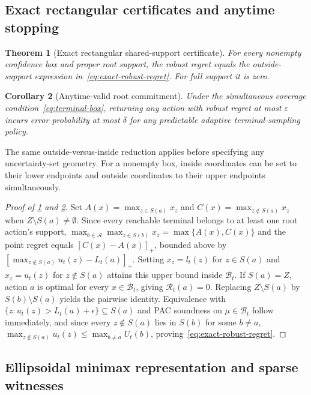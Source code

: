\documentclass{article}
\theoremstyle{plain}
\newtheorem{theorem}{Theorem}[section]
\newtheorem{corollary}[theorem]{Corollary}
\theoremstyle{definition}
\begin{document}
\subsection{Exact rectangular certificates and anytime stopping}
\label{app:rect-proof}

\begin{theorem}[Exact rectangular shared-support certificate]
\label{thm:shared-regret}\label{thm:regret}
For every nonempty confidence box and proper root support, the robust regret equals the outside-support expression in~\eqref{eq:exact-robust-regret}. For full support it is zero.
\end{theorem}
\begin{corollary}[Anytime-valid root commitment]\label{cor:shared-regret-pac}
Under the simultaneous coverage condition~\eqref{eq:terminal-box}, returning any action with robust regret at most $\varepsilon$ incurs error probability at most $\delta$ for any predictable adaptive terminal-sampling policy.
\end{corollary}

The same outside-versus-inside reduction applies before specifying any uncertainty-set geometry. For a nonempty box, inside coordinates can be set to their lower endpoints and outside coordinates to their upper endpoints simultaneously.

\begin{proof}[Proof of \cref{thm:shared-regret} and \cref{cor:shared-regret-pac}]
Set $A(x)=\max_{z\in S(a)}x_z$ and $C(x)=\max_{z\notin S(a)}x_z$ when $Z\setminus S(a)\ne\emptyset$. Since every reachable terminal belongs to at least one root action's support, $\max_{b\in\mathcal A}\max_{z\in S(b)}x_z=\max\{A(x),C(x)\}$ and the point regret equals $[C(x)-A(x)]_+$, bounded above by $[\max_{z\notin S(a)}u_t(z)-L_t(a)]_+$. Setting $x_z=l_t(z)$ for $z\in S(a)$ and $x_z=u_t(z)$ for $z\notin S(a)$ attains this upper bound inside $\mathcal B_t$. If $S(a)=Z$, action $a$ is optimal for every $x\in\mathcal B_t$, giving $\mathcal R_t(a)=0$. Replacing $Z\setminus S(a)$ by $S(b)\setminus S(a)$ yields the pairwise identity. Equivalence with $\{z:u_t(z)>L_t(a)+\epsilon\}\subseteq S(a)$ and PAC soundness on $\mu\in\mathcal B_t$ follow immediately, and since every $z\notin S(a)$ lies in $S(b)$ for some $b\ne a$, $\max_{z\notin S(a)}u_t(z)\le \max_{b\ne a}U_t(b)$, proving~\eqref{eq:exact-robust-regret}.
\end{proof}

\subsection{Ellipsoidal minimax representation and sparse witnesses}
\label{app:ellipsoid-proofs}
\end{document}
